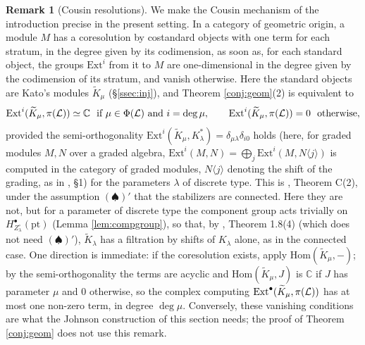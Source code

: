 \documentclass[a4paper,12pt,leqno]{amsart}
\theoremstyle{plain}
\theoremstyle{definition}
\newtheorem{rmk}[thm]{Remark}
\begin{document}
\begin{rmk}[Cousin resolutions]\label{rmk:cousin} We make the Cousin mechanism of the introduction
precise in the present setting. In a category of geometric origin, a module $M$ has a coresolution by
costandard objects with one term for each stratum, in the degree given by its codimension, as soon as,
for each standard object, the groups $\mathrm{Ext}^i$ from it to $M$ are one-dimensional in the degree
given by the codimension of its stratum, and vanish otherwise. Here the standard objects are Kato's modules $\widetilde K_\mu$ (\S\ref{ssec:inj}), and
Theorem \ref{conj:geom}(2) is equivalent to
\[\mathrm{Ext}^i(\widetilde K_\mu,\pi(\mathcal{L}))\simeq\mathbb{C}\ \text{ if }\mu\in\Phi(\mathcal{L})\text{ and
}i=\deg\mu,\qquad\mathrm{Ext}^i(\widetilde K_\mu,\pi(\mathcal{L}))=0\ \text{ otherwise},\]
provided the semi-orthogonality $\mathrm{Ext}^i(\widetilde K_\mu,K_\lambda^*)=\delta_{\mu\lambda}
\delta_{i0}$ holds (here, for graded modules $M,N$ over a graded algebra,
$\mathrm{Ext}^i(M,N)=\bigoplus_j\mathrm{Ext}^i(M,N\langle j\rangle)$ is computed in the category of graded
modules, $N\langle j\rangle$ denoting the shift of the grading, as in \cite{Kat17}, \S1) for the parameters $\lambda$ of discrete type. This is \cite{Kat17}, Theorem C(2),
under the assumption $(\spadesuit)'$ that the stabilizers are connected. Here they are not, but for a
parameter of discrete type the component group acts trivially on $H^\bullet_{Z_\lambda^\circ}(\mathrm{pt})$
(Lemma \ref{lem:compgroup}), so that, by \cite{Kat17}, Theorem 1.8(4) (which does not need
$(\spadesuit)'$), $\widetilde K_\lambda$ has a filtration by shifts of $K_\lambda$ alone, as in the
connected case. One direction is immediate: if the coresolution exists, apply
$\mathrm{Hom}(\widetilde K_\mu,-)$; by the semi-orthogonality the terms are acyclic and
$\mathrm{Hom}(\widetilde K_\mu,J)$ is $\mathbb{C}$ if $J$ has parameter $\mu$ and $0$ otherwise, so the
complex computing $\mathrm{Ext}^\bullet(\widetilde K_\mu,\pi(\mathcal{L}))$ has at most one non-zero term, in
degree $\deg\mu$. Conversely, these vanishing conditions are what the Johnson construction of this section needs;
the proof of Theorem \ref{conj:geom} does not use this remark.
\end{rmk}
\end{document}
